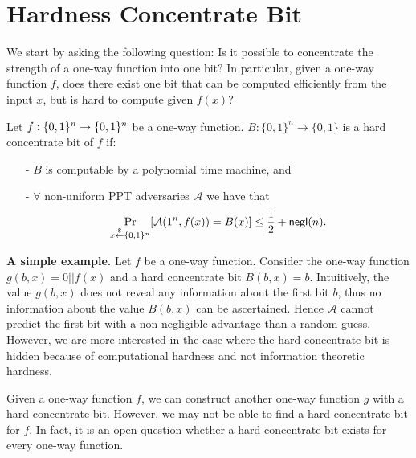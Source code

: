 \documentclass[12pt]{tufte-book}
\providecommand{\DIFaddbegin}{} %
\providecommand{\DIFaddend}{} %
\newcommand{\DIFaddincludegraphics}[2][]{{\color{blue}\fbox{\DIFOincludegraphics[#1]{#2}}}} %
\DeclareRobustCommand{\DIFaddbegin}{\DIFOaddbegin \let\includegraphics\DIFaddincludegraphics} %
\DeclareRobustCommand{\DIFaddend}{\DIFOaddend \let\includegraphics\DIFOincludegraphics} %
\begin{document}
\section{Hardness Concentrate Bit}
We start by asking the following question: Is it possible to concentrate the strength of a one-way function into one bit? In particular, given a one-way function $f$, does there exist one bit that can be computed efficiently from the input $x$, but is hard to compute given $f(x)$?
\begin{definition}
Let $f:\{0,1\}^{n} \rightarrow \{0,1\}^{n}$ be a one-way function.
$B:\{0,1\}^n \rightarrow \{0,1\}$ is a hard concentrate bit of $f$ if:
\begin{itemize}
\item[-] $B$ is computable by a polynomial time machine, and
\item[-] $\forall$ non-uniform PPT adversaries $\mathcal{A}$ we have that
	$$\Pr_{x\stackrel{\$}{\leftarrow} \{0,1\}^{n}}[\mathcal{A}(1^n, f(x)) = B(x)] \leq \frac{1}{2} + \mathsf{negl}(n).$$
\end{itemize}
\end{definition}

\noindent\textbf{A simple example.}
Let $f$ be a one-way function. Consider the one-way function $g(b, x) = 0 || f(x)$ and a hard concentrate bit $B(b, x) = b$.
Intuitively, the value $g(b, x)$ does not reveal any information about the first bit $b$, thus no information about the value $B(b, x)$ can be ascertained. Hence $\mathcal{A}$ cannot predict the first bit with a non-negligible advantage than a random guess. However, we are more interested in the case where the hard concentrate bit is hidden because of computational hardness and not information theoretic hardness.
\DIFaddbegin 

\bigskip
\DIFaddend \begin{remark}
Given a one-way function $f$, we can construct another one-way function $g$ with a hard concentrate bit. However, we may not be able to find a hard concentrate bit for $f$. In fact, it is an open question whether a hard concentrate bit exists for every one-way function.
\end{remark}
\end{document}
